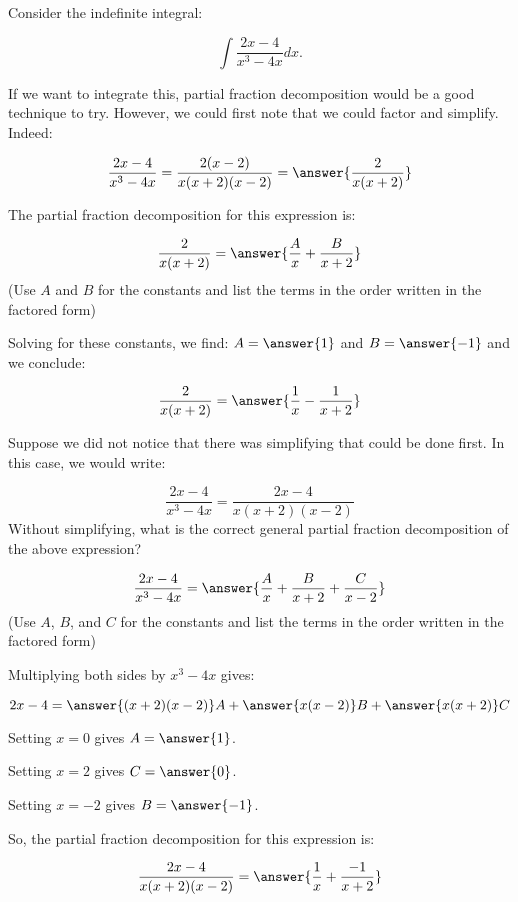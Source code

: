 \documentclass{ximera}
\author{Jim Talamo}
\begin{document}
\begin{exercise}
Consider the indefinite integral: 

\[
\int \frac{2x-4}{x^3-4x} dx.
\]

If we want to integrate this, partial fraction decomposition would be a good technique to try.  However, we could first note that we could factor and simplify.  Indeed:

\[
\frac{2x-4}{x^3-4x} = \frac{2(x-2)}{x(x+2)(x-2)} = \answer{\frac{2}{x(x+2)}}
\]  

The partial fraction decomposition for this expression is:

\[
\frac{2}{x(x+2)} = \answer{\frac{A}{x}+\frac{B}{x+2}}
\]
(Use $A$ and $B$ for the constants and list the terms in the order written in the factored form)

\begin{exercise}
Solving for these constants, we find: $A = \answer{1}$ and $B=\answer{-1}$ and we conclude:

\[
\frac{2}{x(x+2)} = \answer{\frac{1}{x}-\frac{1}{x+2}}
\]


\begin{exercise}
Suppose we did not notice that there was simplifying that could be done first.  In this case, we would write:

\[
\frac{2x-4}{x^3-4x} = \frac{2x-4}{x(x+2)(x-2)} 
\]  
Without simplifying, what is the correct general partial fraction decomposition of the above expression?

\[
\frac{2x-4}{x^3-4x} = \answer{\frac{A}{x}+\frac{B}{x+2} +\frac{C}{x-2}}
\]  
(Use $A$, $B$, and $C$ for the constants and list the terms in the order written in the factored form)

\begin{exercise}

Multiplying both sides by $x^3-4x$ gives:

\[
2x-4 = \answer{(x+2)(x-2)}A+\answer{x(x-2)}B +\answer{x(x+2)}C
\]  

\begin{exercise}
Setting $x=0$ gives $A=\answer{1}$.

Setting $x=2$ gives $C=\answer{0}$.

Setting $x=-2$ gives $B=\answer{-1}$.

So, the partial fraction decomposition for this expression is:

\[
\frac{2x-4}{x(x+2)(x-2)}  = \answer{\frac{1}{x}+\frac{-1}{x+2}}
\]


\begin{multipleChoice}
\end{multipleChoice}


\end{exercise}
\end{exercise}
\end{exercise}
\end{exercise}
\end{exercise}
\end{document}
